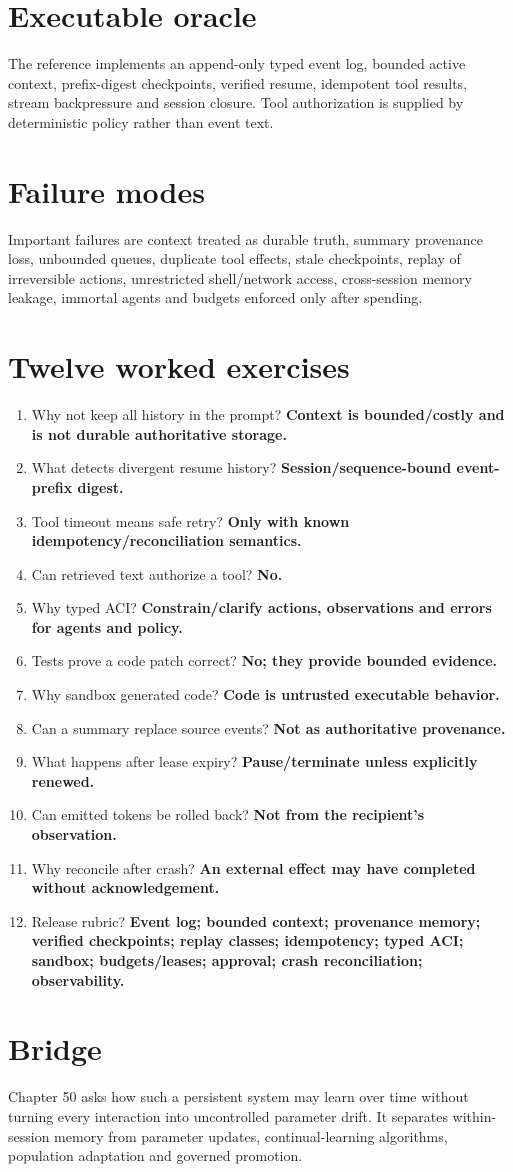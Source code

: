\section{Executable oracle}
The reference implements an append-only typed event log, bounded active context, prefix-digest checkpoints, verified resume, idempotent tool results, stream backpressure and session closure. Tool authorization is supplied by deterministic policy rather than event text.

\section{Failure modes}
Important failures are context treated as durable truth, summary provenance loss, unbounded queues, duplicate tool effects, stale checkpoints, replay of irreversible actions, unrestricted shell/network access, cross-session memory leakage, immortal agents and budgets enforced only after spending.

\section{Twelve worked exercises}
\begin{enumerate}
\item Why not keep all history in the prompt? \textbf{Context is bounded/costly and is not durable authoritative storage.}
\item What detects divergent resume history? \textbf{Session/sequence-bound event-prefix digest.}
\item Tool timeout means safe retry? \textbf{Only with known idempotency/reconciliation semantics.}
\item Can retrieved text authorize a tool? \textbf{No.}
\item Why typed ACI? \textbf{Constrain/clarify actions, observations and errors for agents and policy.}
\item Tests prove a code patch correct? \textbf{No; they provide bounded evidence.}
\item Why sandbox generated code? \textbf{Code is untrusted executable behavior.}
\item Can a summary replace source events? \textbf{Not as authoritative provenance.}
\item What happens after lease expiry? \textbf{Pause/terminate unless explicitly renewed.}
\item Can emitted tokens be rolled back? \textbf{Not from the recipient's observation.}
\item Why reconcile after crash? \textbf{An external effect may have completed without acknowledgement.}
\item Release rubric? \textbf{Event log; bounded context; provenance memory; verified checkpoints; replay classes; idempotency; typed ACI; sandbox; budgets/leases; approval; crash reconciliation; observability.}
\end{enumerate}

\section{Bridge}
Chapter 50 asks how such a persistent system may learn over time without turning every interaction into uncontrolled parameter drift. It separates within-session memory from parameter updates, continual-learning algorithms, population adaptation and governed promotion.

